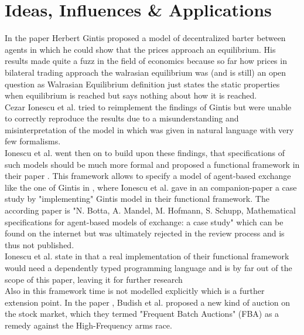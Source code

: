 \documentclass{article}
\begin{document}

\section{Ideas, Influences \& Applications}
In the paper \cite{Gintis2006} Herbert Gintis proposed a model of decentralized barter between agents in which he could show that the prices approach an equilibrium. His results made quite a fuzz in the field of economics because so far how prices in bilateral trading approach the walrasian equilibrium was (and is still) an open question as Walrasian Equilibrium definition just states the static properties when equilibrium is reached but says nothing about how it is reached. \\
Cezar Ionescu et al. tried to reimplement the findings of Gintis but were unable to correctly reproduce the results due to a misunderstanding and misinterpretation of the model in \cite{Gintis2006} which was given in natural language with very few formalisms. \\
Ionescu et al. went then on to build upon these findings, that specifications of such models should be much more formal and proposed a functional framework in their paper \cite{Botta20114025}. This framework allows to specify a model of agent-based exchange like the one of Gintis in \cite{Gintis2006}, where Ionescu et al. gave in an companion-paper a case study by "implementing" Gintis model in their functional framework. The according paper is "N. Botta, A. Mandel, M. Hofmann, S. Schupp, Mathematical specifications for agent-based models of exchange: a case study" which can be found on the internet but was ultimately rejected in the review process and is thus not published. \\
Ionescu et al. state in \cite{Botta20114025} that a real implementation of their functional framework would need a dependently typed programming language and is by far out of the scope of this paper, leaving it for further research \\
Also in this framework time is not modelled explicitly which is a further extension point.
\bigskip
In the paper \cite{Budish2015}, Budish et al. proposed a new kind of auction on the stock market, which they termed "Frequent Batch Auctions" (FBA) as a remedy against the High-Frequency arms race. 
\end{document}
